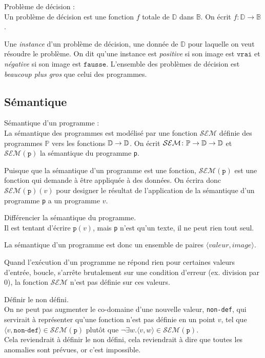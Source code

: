     \begin{definition}\label{def:pb-decision}
        Problème de décision :\\
        Un problème de décision est une fonction \(f\) totale de \(\mathbb{D}\) dans \(\mathbb{B}\). On écrit \(f\colon\mathbb{D}\rightarrow\mathbb{B}\).
    \end{definition}

    Une \emph{instance} d'un problème de décision, une donnée de \(\mathbb{D}\) pour laquelle on veut résoudre le problème. On dit qu'une instance est \emph{positive} si son image est \(\mathtt{vrai}\) et \emph{négative} si son image est \(\mathtt{fausse}\). L'ensemble des problèmes de décision est \emph{beaucoup plus gros} que celui des programmes.

    \subsection{S\'emantique}
        \begin{definition}\label{def:sementique}
        Sémantique d'un programme :\\
        La sémantique des programmes est modélisé par une fonction \(\mathcal{SEM}\) définie des programmes \(\mathbb{P}\) vers les fonctions \(\mathbb{D}\rightarrow\mathbb{D}\). On écrit \(\mathcal{SEM}\colon\mathbb{P}\rightarrow\mathbb{D}\rightarrow\mathbb{D}\) et \(\mathcal{SEM}(\texttt{p})\) la sémantique du programme \texttt{p}.
    \end{definition}

    Puisque que la sémantique d'un programme est une fonction, \(\mathcal{SEM}(\texttt{p})\) est une fonction qui demande à être appliquée \`a des données. On écrira donc \(\mathcal{SEM}(\texttt{p})(v)\) pour designer le résultat de l'application de la sémantique d'un programme \texttt{p} a un programme \(v\).
    \begin{Note}Différencier la sémantique du programme.\\
        Il est tentant d'écrire \(\texttt{p}(v)\), mais \texttt{p} n'est qu'un texte, il ne peut rien tout seul.
    \end{Note}
    La sémantique d'un programme est donc un ensemble de paires \(\langle valeur, image\rangle\).\par
    
    Quand l'exécution d'un programme ne répond rien pour certaines valeurs d'entrée, boucle, s'arrête brutalement sur une condition d'erreur (ex. division par 0), la fonction \(\mathcal{SEM}\) n'est pas définie sur ces valeurs.\par
    \begin{Note} Définir le non défini.\\
        On ne peut pas augmenter le co-domaine d'une nouvelle valeur, \texttt{non-def}, qui servirait à représenter qu'une fonction n'est pas définie en un point \(v\), tel que \(\langle v,\texttt{non-def}\rangle\in \mathcal{SEM}(\texttt{p})\) plutôt que \(\lnot\exists w.\langle v,w\rangle\in \mathcal{SEM}(\texttt{p})\).\\
        Cela reviendrait à définir le non défini, cela reviendrait à dire que toutes les anomalies sont prévues, or c'est impossible.
    \end{Note}

